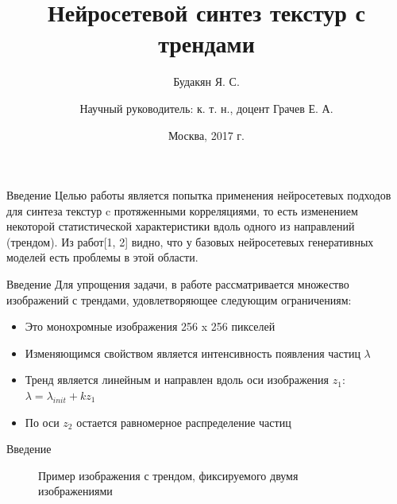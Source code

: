 \documentclass[12pt]{beamer}
\begin{document}
	\title{Нейросетевой синтез текстур с трендами}
	\author{Будакян Я. С. \and \break \break Научный руководитель: к. т. н., доцент Грачев Е. А.}
	\date{Москва, 2017 г.} 

	\maketitle

	\begin{frame}{Введение}
		Целью работы является попытка применения нейросетевых подходов для синтеза текстур c протяженными корреляциями, то есть изменением некоторой статистической характеристики вдоль одного из направлений (трендом). Из работ[1, 2] видно, что у базовых нейросетевых генеративных моделей есть проблемы в этой области.
	\end{frame}
	
	\begin{frame}{Введение}
		Для упрощения задачи, в работе рассматривается множество изображений с трендами, удовлетворяющее следующим ограничениям:
		
		\begin{itemize}
			\item Это монохромные изображения 256 x 256 пикселей
			\item Изменяющимся свойством является интенсивность появления частиц $\lambda$
			\item Тренд является линейным и направлен вдоль оси изображения $z_1$: 
			$ \lambda = \lambda_{init} + k z_1 $
			\item По оси $z_2$ остается равномерное распределение частиц
		\end{itemize}
	\end{frame}
	
	\begin{frame}{Введение}
		\begin{figure}[h]
			\caption{Пример изображения с трендом, фиксируемого двумя изображениями}
			\label{1-trend-example}
		\end{figure}
	\end{frame}
	
\end{document}

